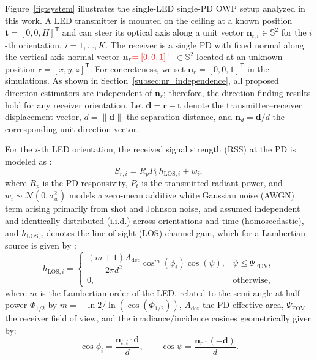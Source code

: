 \documentclass[journal]{IEEEtran}
\newcommand{\added}[1]{{\color{blue}#1}}
\newcommand{\deleted}[1]{{\color{red}#1}}
\begin{document}
Figure~\ref{fig:system} illustrates the single-LED single-PD OWP setup analyzed in this work.  
A LED transmitter is mounted on the ceiling at a known position  
\(\mathbf{t}=[0,0,H]^{\mathsf T}\) and can steer its optical axis along a unit vector
\(\mathbf{n}_{t,i}\!\in\!\mathbb{S}^{2}\) for the \(i\)-th orientation, \(i=1,\dots,K\).  
The receiver is a single PD with \deleted{fixed normal along the vertical axis} \added{normal vector} 
\(\mathbf{n}_{r}\deleted{=[0,0,1]^{\mathsf T}}\) \added{$\in\mathbb{S}^2$} located at an unknown position  
\(\mathbf{r}=[x,y,z]^{\mathsf T}\). \added{For concreteness, we set $\mathbf{n}_r=[0,0,1]^{\mathsf T}$ in the simulations. As shown in Section~\ref{subsec:nr_independence}, all proposed direction estimators are independent of $\mathbf{n}_r$; therefore, the direction-finding results hold for any receiver orientation.}  
Let \(\mathbf{d}=\mathbf{r}-\mathbf{t}\) denote the transmitter--receiver displacement vector, \(d=\lVert \mathbf{d}\rVert\) the separation distance, and \(\mathbf{n}_{d}= \mathbf{d}/d\) the corresponding unit direction vector.

For the \(i\)-th LED orientation, the received signal strength (RSS) at the PD is modeled as \cite{Kahn1997}:
\begin{equation}
S_{r,i} = R_pP_{t}\,h_{\text{LOS},i} + w_i,
\label{eq:Sr_i}
\end{equation}
where \(R_p\) is the PD responsivity,
\(P_{t}\) is the transmitted radiant power,
and \(w_i \sim \mathcal{N}(0,\sigma_{w}^{2})\) models a zero-mean additive white Gaussian noise (AWGN) term arising primarily from shot and Johnson noise, and assumed independent and identically distributed (i.i.d.) across orientations and time (homoscedastic), and \(h_{\text{LOS},i}\) denotes the line-of-sight (LOS) channel gain, which for a Lambertian source is given by \cite{Kahn1997}:
\begin{equation}
h_{\text{LOS},i} =
\begin{cases}
\dfrac{(m+1)A_{\text{det}}}{2\pi d^{2}}
      \cos^{m}(\phi_{i})\cos(\psi), & \psi \leq \Psi_{\text{FOV}}, \\[6pt]
0, & \text{otherwise},
\end{cases}
\label{eq:hLOS}
\end{equation}
where \(m\) is the Lambertian order of the LED, related to the semi-angle at half power \(\Phi_{1/2}\) by \(m = -\ln2/\ln(\cos(\Phi_{1/2}))\),
\(A_{\text{det}}\) the PD effective area,  
\(\Psi_{\text{FOV}}\) the receiver field of view,  
and the irradiance/incidence cosines geometrically given by:
\begin{equation}
\cos\phi_{i}= \dfrac{\mathbf{n}_{t,i}\!\cdot\!\mathbf{d}}{d},
\qquad
\cos\psi    = \dfrac{\mathbf{n}_{r}\!\cdot(-\mathbf{d})}{d}.
\label{eq:cosines}
\end{equation}
\end{document}
